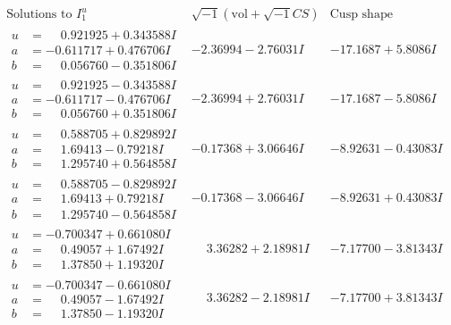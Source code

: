 \documentclass[1p]{elsarticle_modified}
\theoremstyle{definition}
\newcommand{\I}{\sqrt{-1}}
\begin{document}
$$\begin{array}{c|c|c}  
\text{Solutions to }I^u_{1}& \I (\text{vol} + \sqrt{-1}CS) & \text{Cusp shape}\\
 \hline 
\begin{aligned}
u &= \phantom{-}0.921925 + 0.343588 I \\
a &= -0.611717 + 0.476706 I \\
b &= \phantom{-}0.056760 - 0.351806 I\end{aligned}
 & -2.36994 - 2.76031 I & -17.1687 + 5.8086 I \\ \hline\begin{aligned}
u &= \phantom{-}0.921925 - 0.343588 I \\
a &= -0.611717 - 0.476706 I \\
b &= \phantom{-}0.056760 + 0.351806 I\end{aligned}
 & -2.36994 + 2.76031 I & -17.1687 - 5.8086 I \\ \hline\begin{aligned}
u &= \phantom{-}0.588705 + 0.829892 I \\
a &= \phantom{-}1.69413 - 0.79218 I \\
b &= \phantom{-}1.295740 + 0.564858 I\end{aligned}
 & -0.17368 + 3.06646 I & -8.92631 - 0.43083 I \\ \hline\begin{aligned}
u &= \phantom{-}0.588705 - 0.829892 I \\
a &= \phantom{-}1.69413 + 0.79218 I \\
b &= \phantom{-}1.295740 - 0.564858 I\end{aligned}
 & -0.17368 - 3.06646 I & -8.92631 + 0.43083 I \\ \hline\begin{aligned}
u &= -0.700347 + 0.661080 I \\
a &= \phantom{-}0.49057 + 1.67492 I \\
b &= \phantom{-}1.37850 + 1.19320 I\end{aligned}
 & \phantom{-}3.36282 + 2.18981 I & -7.17700 - 3.81343 I \\ \hline\begin{aligned}
u &= -0.700347 - 0.661080 I \\
a &= \phantom{-}0.49057 - 1.67492 I \\
b &= \phantom{-}1.37850 - 1.19320 I\end{aligned}
 & \phantom{-}3.36282 - 2.18981 I & -7.17700 + 3.81343 I \\ \hline\begin{aligned}

\end{aligned}
\end{array}$$
\end{document}
